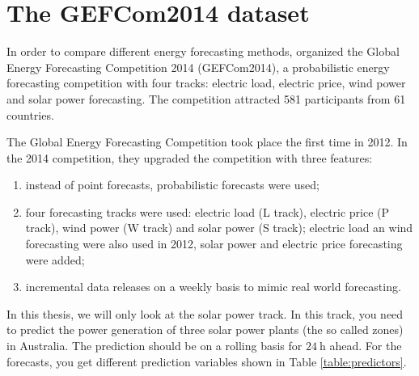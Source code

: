 \section{The GEFCom2014 dataset}

In order to compare different energy forecasting methods, 
\Textcite{Hong2016} organized the Global Energy Forecasting Competition 2014 (GEFCom2014), 
a probabilistic energy forecasting competition with four tracks: 
electric load, electric price, wind power and solar power forecasting. 
The competition attracted 581 participants from 61 countries. 

The Global Energy Forecasting Competition took place the first time in 2012. 
In the 2014 competition, they upgraded the competition with three features: 
\begin{enumerate}
    \item instead of point forecasts, probabilistic forecasts were used;
    \item four forecasting tracks were used: electric load (L track), 
    electric price (P track), wind power (W track) and solar power (S track);
    electric load an wind forecasting were also used in 2012, solar power and 
    electric price forecasting were added;
    \item incremental data releases on a weekly basis to mimic real world forecasting.
\end{enumerate}

In this thesis, we will only look at the solar power track. 
In this track, you need to predict the power generation of three 
solar power plants (the so called zones) in Australia. 
The prediction should be on a rolling basis for \(\SI{24}{\hour}\) ahead. 
For the forecasts, you get different prediction variables shown in Table \ref{table:predictors}.

